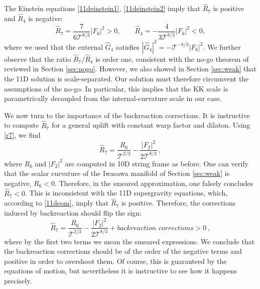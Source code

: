 \documentclass[11pt]{article}
\newcommand{\be}{\begin{equation}}
\newcommand{\ee}{\end{equation}}
\def\be{\begin{equation}}
\def\ee{\end{equation}}
\renewcommand{\[}{\left[}
\renewcommand{\]}{\right]}
\renewcommand{\(}{\left(}
\renewcommand{\)}{\right)}
\newcommand{\<}{\langle}
\renewcommand{\>}{\rangle}
\begin{document}
The Einstein equations \eqref{11deinstein1}, \eqref{11deinstein2} imply that $\hat R_7$ is positive and $\hat R_4$ is negative:
\begin{equation}
\hat R_7 = \frac{7}{6\mathcal{T}^{8/3}} |F_6|^2 >0, \qquad \hat R_4 = -\frac{4}{3\mathcal{T}^{8/3}} |F_6|^2  <0, \label{11deom}
\end{equation}
where we used that the external $\hat G_4$ satisfies $|\hat G_4|^2=-\mathcal{T}^{-8/3} |F_6|^2$. We further observe that the ratio $\hat R_7/\hat R_4$ is order one, consistent with the no-go theorem of \cite{Gautason:2015tig} reviewed in Section \ref{sec:nogo}. However, we also showed in Section \ref{sec:weak} that the 11D solution is scale-separated. Our solution must therefore circumvent the assumptions of the no-go. In particular, this implies that the KK scale is parametrically decoupled from the internal-curvature scale in our case.

We now turn to the importance of the backreaction corrections. It is instructive to compute $\hat R_7$ for a general uplift with constant warp factor and dilaton.
Using \eqref{r7}, we find
\be
\hat{R}_7 = \frac{R_6}{\mathcal{T}^{2/3}} - \frac{|F_2|^2}{2\mathcal{T}^{8/3}}\,,
\ee
where $R_6$ and $|F_2|^2$ are computed in 10D string frame as before. One can verify that the scalar curvature of the Iwasawa manifold of Section \ref{sec:weak} is negative, $R_6< 0$. Therefore, in the smeared approximation, one falsely concludes $\hat R_7<0$. This is inconsistent with the 11D supergravity equations, which, according to \eqref{11deom}, imply that $\hat R_7$ is positive. Therefore, the corrections induced by backreaction should flip the sign:
\be
\hat{R}_7 = \frac{R_6}{\mathcal{T}^{2/3}} - \frac{|F_2|^2}{2\mathcal{T}^{8/3}} + \textit{backreaction corrections} >0\,,
\ee
where by the first two terms we mean the smeared expressions.
We conclude that the backreaction corrections should be of the order of the negative terms and positive in order to overshoot them. Of course, this is guaranteed by the equations of motion, but nevertheless it is instructive to see how it happens precisely.
\end{document}
